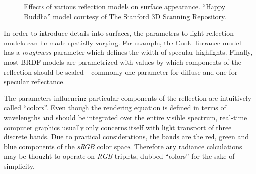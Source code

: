 \begin{figure}[ht!]
  \caption{Effects of various reflection models on surface appearance. ``Happy Buddha'' model courtesy of The Stanford 3D Scanning Repository.}
  \label{fig:Buddha_reflectionModels}
\end{figure}

In order to introduce details into surfaces, the parameters to light reflection models can be made spatially-varying. For example, the Cook-Torrance model has a \emph{roughness} parameter which defines the width of specular highlights.  Finally, most BRDF models are parametrized with values by which components of the reflection should be scaled -- commonly one parameter for diffuse and one for specular reflectance.

The parameters influencing particular components of the reflection are intuitively called ``colors''. Even though the rendering equation is defined in terms of wavelengths and should be integrated over the entire visible spectrum, real-time computer graphics usually only concerns itself with light transport of three discrete bands. Due to practical considerations, the bands are the red, green and blue components of the \emph{sRGB} color space. Therefore any radiance calculations may be thought to operate on \emph{RGB} triplets, dubbed ``colors'' for the sake of simplicity.

